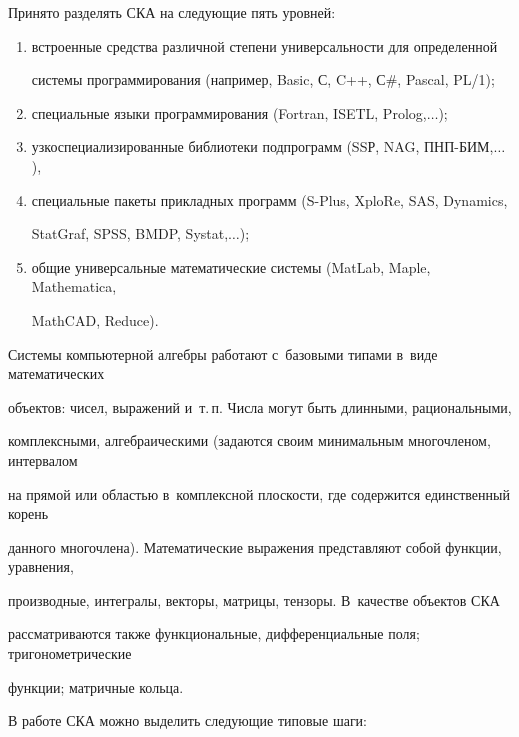 Принято разделять СКА на следующие пять уровней:

\begin{enumerate}[(1)]

\item  встроенные средства различной степени универсальности для определенной 

системы программирования (например, Basic, С, C++, С\#, Pascal, PL/1);



\item  специальные языки программирования (Fortran, ISETL, Prolog,$\ldots$);



\item  узкоспециализированные библиотеки подпрограмм (SSР, NAG, ПНП-БИМ,$\ldots$),



\item  специальные пакеты прикладных программ (S-Plus, XploRe, SAS, Dynamics, 

StatGraf, SPSS, BMDP, Systat,$\ldots$);



\item  общие универсальные математические системы (MatLab, Maple, Mathematica, 

MathCAD, Reduce).

\end{enumerate}



Системы компьютерной алгебры  работают с~базовыми типами в~виде математических 

объектов: чисел, выражений и~т.\,п. Числа могут быть длинными, рациональными, 

комплексными, алгебраическими (задаются своим минимальным многочленом, интервалом 

на прямой или областью в~комплексной плос\-кости, где содержится единственный корень 

данного многочлена). Математические выражения представляют собой функции, уравнения, 

производные, интегралы, векторы, матрицы, тензоры. В~качестве объектов СКА 

рассматриваются также функциональные, дифференциальные поля; тригонометрические 

функции; матричные кольца.



В работе СКА можно выделить следующие типовые шаги:

